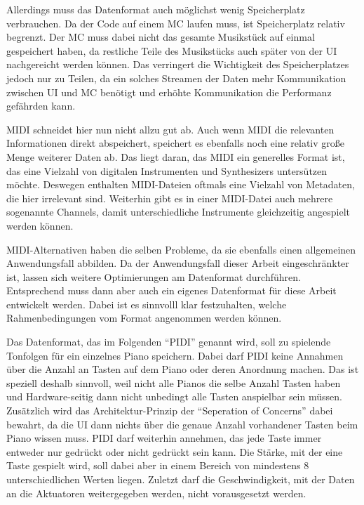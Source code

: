 Allerdings muss das Datenformat auch möglichst wenig Speicherplatz verbrauchen.
Da der Code auf einem \ac{MC} laufen muss, ist Speicherplatz relativ begrenzt.
Der \ac{MC} muss dabei nicht das gesamte Musikstück auf einmal gespeichert haben, da restliche Teile des Musikstücks auch später von der \ac{UI} nachgereicht werden können.
Das verringert die Wichtigkeit des Speicherplatzes jedoch nur zu Teilen, da ein solches Streamen der Daten mehr Kommunikation zwischen \ac{UI} und {MC} benötigt und erhöhte Kommunikation die Performanz gefährden kann.

MIDI schneidet hier nun nicht allzu gut ab.
Auch wenn MIDI die relevanten Informationen direkt abspeichert, speichert es ebenfalls noch eine relativ große Menge weiterer Daten ab.
Das liegt daran, das MIDI ein generelles Format ist, das eine Vielzahl von digitalen Instrumenten und Synthesizers untersützen möchte.
Deswegen enthalten MIDI-Dateien oftmals eine Vielzahl von Metadaten, die hier irrelevant sind.
Weiterhin gibt es in einer MIDI-Datei auch mehrere sogenannte Channels, damit unterschiedliche Instrumente gleichzeitig angespielt werden können.

MIDI-Alternativen haben die selben Probleme, da sie ebenfalls einen allgemeinen Anwendungsfall abbilden.
Da der Anwendungsfall dieser Arbeit eingeschränkter ist, lassen sich weitere Optimierungen am Datenformat durchführen.
Entsprechend muss dann aber auch ein eigenes Datenformat für diese Arbeit entwickelt werden.
Dabei ist es sinnvolll klar festzuhalten, welche Rahmenbedingungen vom Format angenommen werden können.

Das Datenformat, das im Folgenden \enquote{\ac{PIDI}} genannt wird, soll zu spielende Tonfolgen für ein einzelnes Piano speichern.
Dabei darf \ac{PIDI} keine Annahmen über die Anzahl an Tasten auf dem Piano oder deren Anordnung machen.
Das ist speziell deshalb sinnvoll, weil nicht alle Pianos die selbe Anzahl Tasten haben und Hardware-seitig dann nicht unbedingt alle Tasten anspielbar sein müssen.
Zusätzlich wird das Architektur-Prinzip der \enquote{Seperation of Concerns} dabei bewahrt, da die \ac{UI} dann nichts über die genaue Anzahl vorhandener Tasten beim Piano wissen muss.
\ac{PIDI} darf weiterhin annehmen, das jede Taste immer entweder nur gedrückt oder nicht gedrückt sein kann.
Die Stärke, mit der eine Taste gespielt wird, soll dabei aber in einem Bereich von mindestens 8 unterschiedlichen Werten liegen.
Zuletzt darf die Geschwindigkeit, mit der Daten an die Aktuatoren weitergegeben werden, nicht vorausgesetzt werden.

